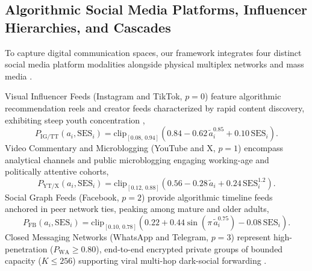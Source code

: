 \documentclass{article}
\begin{document}
\subsection{Algorithmic Social Media Platforms, Influencer Hierarchies, and Cascades}
\label{subsec:methods_social_media}

To capture digital communication spaces, our framework integrates four distinct social media platform modalities alongside physical multiplex networks and mass media \citep{cinelli2021echo, tucker2018social}.

Visual Influencer Feeds (Instagram and TikTok, $p = 0$) feature algorithmic recommendation reels and creator feeds characterized by rapid content discovery, exhibiting steep youth concentration \citep{kantar2023inside, reuters2023digital},
\begin{equation}
    P_{\mathrm{IG/TT}}(a_i, \mathrm{SES}_i) = \mathrm{clip}_{[0.08,\, 0.94]}\!\left(0.84 - 0.62\,\tilde{a}_i^{0.85} + 0.10\,\mathrm{SES}_i\right).
    \label{eq:reach_ig_tt}
\end{equation}
Video Commentary and Microblogging (YouTube and X, $p = 1$) encompass analytical channels and public microblogging engaging working-age and politically attentive cohorts,
\begin{equation}
    P_{\mathrm{YT/X}}(a_i, \mathrm{SES}_i) = \mathrm{clip}_{[0.12,\, 0.88]}\!\left(0.56 - 0.28\,\tilde{a}_i + 0.24\,\mathrm{SES}_i^{1.2}\right).
    \label{eq:reach_yt_x}
\end{equation}
Social Graph Feeds (Facebook, $p = 2$) provide algorithmic timeline feeds anchored in peer network ties, peaking among mature and older adults,
\begin{equation}
    P_{\mathrm{FB}}(a_i, \mathrm{SES}_i) = \mathrm{clip}_{[0.10,\, 0.78]}\!\left(0.22 + 0.44\sin(\pi\,\tilde{a}_i^{0.75}) - 0.08\,\mathrm{SES}_i\right).
    \label{eq:reach_fb}
\end{equation}
Closed Messaging Networks (WhatsApp and Telegram, $p = 3$) represent high-penetration ($P_{\mathrm{WA}} \ge 0.80$), end-to-end encrypted private groups of bounded capacity ($K \le 256$) supporting viral multi-hop dark-social forwarding \citep{resende2019whatsapp, garimella2020images}.
\end{document}
